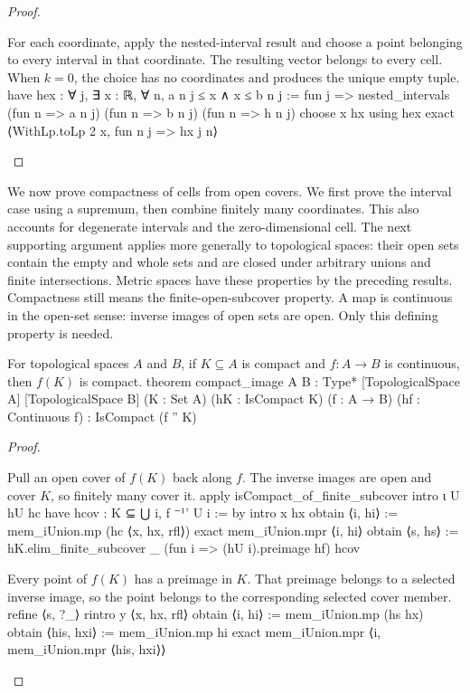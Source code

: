 \begin{proof}
  \begin{lean}{For each coordinate, apply the nested-interval result and choose a point belonging to every interval in that coordinate. The resulting vector belongs to every cell. When $k=0$, the choice has no coordinates and produces the unique empty tuple.}
    have hex : ∀ j, ∃ x : ℝ, ∀ n, a n j ≤ x ∧ x ≤ b n j :=
      fun j => nested_intervals (fun n => a n j) (fun n => b n j) (fun n => h n j)
    choose x hx using hex
    exact ⟨WithLp.toLp 2 x, fun n j => hx j n⟩
  \end{lean}

\end{proof}

We now prove compactness of cells from open covers. We first prove the interval case using a supremum, then combine finitely many coordinates. This also accounts for degenerate intervals and the zero-dimensional cell.
The next supporting argument applies more generally to topological spaces: their open sets contain the empty and whole sets and are closed under arbitrary unions and finite intersections. Metric spaces have these properties by the preceding results. Compactness still means the finite-open-subcover property. A map is continuous in the open-set sense: inverse images of open sets are open. Only this defining property is needed.

\begin{lemma} \label{an1:lem:compact-image}
  \begin{lean}{For topological spaces $A$ and $B$, if $K\subseteq A$ is compact and $f:A\to B$ is continuous, then $f(K)$ is compact.}
    theorem compact_image {A B : Type*} [TopologicalSpace A] [TopologicalSpace B]
        (K : Set A) (hK : IsCompact K) (f : A → B) (hf : Continuous f) :
        IsCompact (f '' K)
  \end{lean}
\end{lemma}

\begin{proof}
  \begin{lean}{Pull an open cover of $f(K)$ back along $f$. The inverse images are open and cover $K$, so finitely many cover it.}
    apply isCompact_of_finite_subcover
    intro ι U hU hc
    have hcov : K ⊆ ⋃ i, f ⁻¹' U i := by
      intro x hx
      obtain ⟨i, hi⟩ := mem_iUnion.mp (hc ⟨x, hx, rfl⟩)
      exact mem_iUnion.mpr ⟨i, hi⟩
    obtain ⟨s, hs⟩ := hK.elim_finite_subcover _ (fun i => (hU i).preimage hf) hcov
  \end{lean}

  \begin{lean}{Every point of $f(K)$ has a preimage in $K$. That preimage belongs to a selected inverse image, so the point belongs to the corresponding selected cover member.}
    refine ⟨s, ?_⟩
    rintro y ⟨x, hx, rfl⟩
    obtain ⟨i, hi⟩ := mem_iUnion.mp (hs hx)
    obtain ⟨his, hxi⟩ := mem_iUnion.mp hi
    exact mem_iUnion.mpr ⟨i, mem_iUnion.mpr ⟨his, hxi⟩⟩
  \end{lean}

\end{proof}

